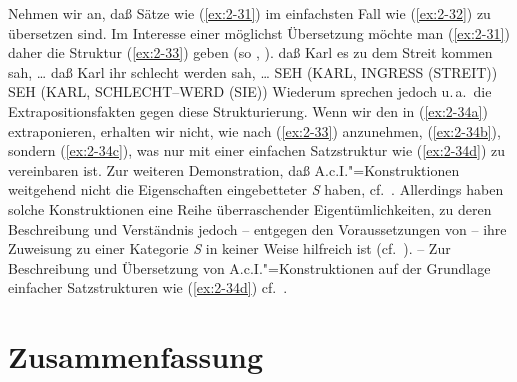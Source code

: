 \documentclass[output=paper]{langsci/langscibook}
\begin{document}
Nehmen wir an, daß Sätze wie (\ref{ex:2-31}) im einfachsten Fall wie (\ref{ex:2-32}) zu übersetzen sind. Im Interesse einer möglichst  Übersetzung möchte man (\ref{ex:2-31}) daher die Struktur (\ref{ex:2-33}) geben (so \zb \citealt[123]{Eisenberg75}, \citealt{Chomsky77, Chomsky78}).
\eal \label{ex:2-31}
	\ex daß Karl es zu dem Streit kommen sah, \ldots{} \label{ex:2-31a}
	\ex daß Karl ihr schlecht werden sah, \ldots{} \label{ex:2-31b}
\zl
\eal \label{ex:2-32}
	\ex SEH (KARL, INGRESS (STREIT)) \label{ex:2-32a}
	\ex SEH (KARL, SCHLECHT--WERD (SIE)) \label{ex:2-32b}
\zl
\eal \label{ex:2-33}
	 \label{ex:2-33a}
	 \label{ex:2-33b}
\zl
Wiederum sprechen jedoch u.\,a.\ die Extrapositionsfakten gegen diese Strukturierung. Wenn wir den  in (\ref{ex:2-34a}) extraponieren, erhalten wir nicht, wie nach (\ref{ex:2-33}) anzunehmen, (\ref{ex:2-34b}), sondern (\ref{ex:2-34c}), was nur mit einer einfachen Satzstruktur wie (\ref{ex:2-34d}) zu vereinbaren ist.
\eal \label{ex:2-34}
	 \label{ex:2-34a}
	 \label{ex:2-34c}
	 \label{ex:2-34d}
\zl
Zur weiteren Demonstration, daß A.c.I."=Konstruktionen weitgehend nicht die Eigenschaften eingebetteter \textit{S} haben, cf.\ \citet{Bech1955, Reis76, Evers75}. Allerdings haben solche Konstruktionen eine Reihe überraschender Eigentümlichkeiten, zu deren Beschreibung und Verständnis jedoch -- entgegen den Voraussetzungen von \citet{Chomsky78, Chomsky77} -- ihre Zuweisung zu einer Kategorie \textit{S} in keiner Weise hilfreich ist (cf.\ \citealt[53--61]{Hoehle78a}). -- Zur Beschreibung und Übersetzung von A.c.I."=Konstruktionen auf der Grundlage einfacher Satzstrukturen wie (\ref{ex:2-34d}) cf.\ \citet[83f.]{Hoehle78a}.%

\section{Zusammenfassung}%
\label{sec:2-4}
\end{document}
